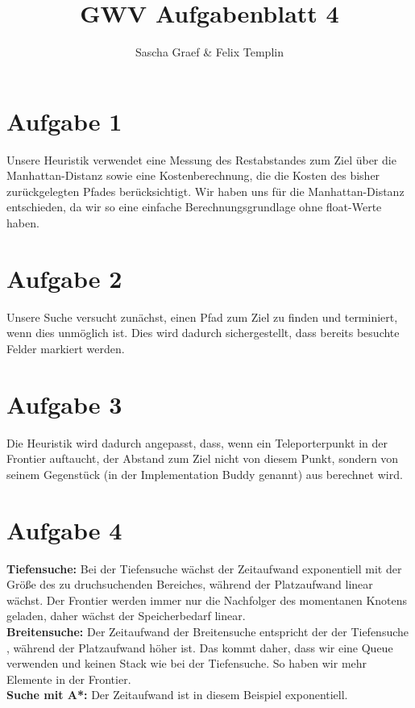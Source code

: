 \documentclass[a4paper,10pt]{article}
\title{GWV Aufgabenblatt 4}
\author{Sascha Graef \& Felix Templin}
\begin{document}
\maketitle



\section*{Aufgabe 1}
Unsere Heuristik verwendet eine Messung des Restabstandes zum Ziel über die Manhattan-Distanz sowie eine
Kostenberechnung, die die Kosten des bisher zurückgelegten Pfades berücksichtigt.
Wir haben uns für die Manhattan-Distanz entschieden, da wir so eine einfache Berechnungsgrundlage ohne float-Werte haben.
\section*{Aufgabe 2}
Unsere Suche versucht zunächst, einen Pfad zum Ziel zu finden und terminiert, wenn dies unmöglich ist.
Dies wird dadurch sichergestellt, dass bereits besuchte Felder markiert werden.
\section*{Aufgabe 3}
Die Heuristik wird dadurch angepasst, dass, wenn ein Teleporterpunkt in der Frontier auftaucht, der Abstand zum Ziel nicht von diesem
Punkt, sondern von seinem Gegenstück (in der Implementation Buddy genannt) aus berechnet wird.
\section*{Aufgabe 4}
\textbf{Tiefensuche:} Bei der Tiefensuche wächst der Zeitaufwand exponentiell mit der Größe des zu druchsuchenden Bereiches, während der Platzaufwand linear wächst. 
Der Frontier werden immer nur die Nachfolger des momentanen Knotens geladen, daher wächst der Speicherbedarf linear.\\
\textbf{Breitensuche:} Der Zeitaufwand der Breitensuche entspricht der der Tiefensuche , während der Platzaufwand höher ist.
Das kommt daher, dass wir eine Queue verwenden und keinen Stack wie bei der Tiefensuche. So haben wir mehr Elemente in der Frontier.\\
\textbf{Suche mit A*:} Der Zeitaufwand ist in diesem Beispiel exponentiell. 
\end{document}
